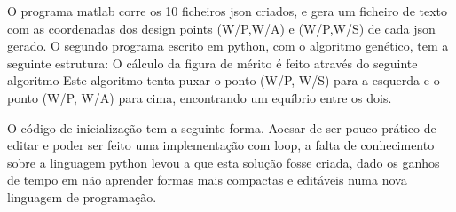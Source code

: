\FloatBarrier
\vspace{5pt}
O programa matlab corre os 10 ficheiros json criados, e gera um ficheiro de texto com as coordenadas dos design points (W/P,W/A) e (W/P,W/S) de cada json gerado.
O segundo programa escrito em python, com o algoritmo genético, tem a seguinte estrutura:
\vspace{5pt}
\FloatBarrier
{}
\FloatBarrier
\vspace{5pt}
O cálculo da figura de mérito é feito através do seguinte algoritmo
\vspace{5pt}
\FloatBarrier
{}
Este algoritmo tenta puxar o ponto (W/P, W/S) para a esquerda e o ponto (W/P, W/A) para cima, encontrando um equíbrio entre os dois.\par
O código de inicialização tem a seguinte forma. Aoesar de ser pouco prático de editar e poder ser feito uma implementação com loop, a falta de conhecimento sobre a linguagem python levou a que esta solução fosse criada, dado os ganhos de tempo em não aprender formas mais compactas e editáveis numa nova linguagem de programação.\par

